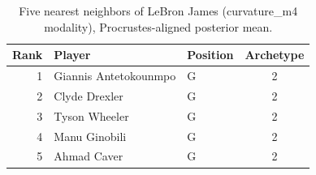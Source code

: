 \begin{table}[htbp]
  \centering\small
  \begin{tabular}{rllc}
    \toprule
    Rank & Player & Position & Archetype \\
    \midrule
    1 & Giannis Antetokounmpo & G & 2 \\
    2 & Clyde Drexler & G & 2 \\
    3 & Tyson Wheeler & G & 2 \\
    4 & Manu Ginobili & G & 2 \\
    5 & Ahmad Caver & G & 2 \\
    \bottomrule
  \end{tabular}
  \caption{Five nearest neighbors of LeBron James (curvature_m4 modality), Procrustes-aligned posterior mean.}
  \label{tab:LeBron_James_neighbors_curvature_m4}
\end{table}

